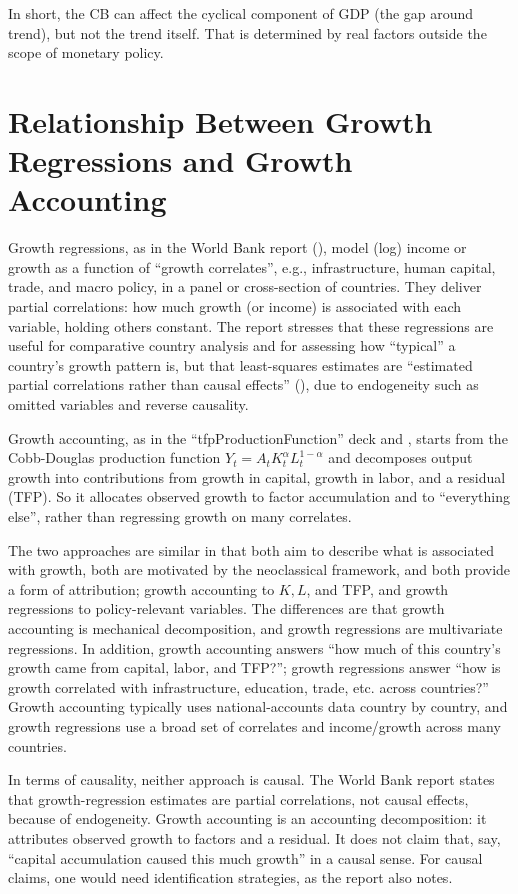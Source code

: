 \documentclass[10pt]{article}
\begin{document}
In short, the CB can affect the cyclical component of GDP (the gap around trend), but not the trend itself. That is determined by real factors outside the scope of monetary policy. 
\section{Relationship Between Growth Regressions and Growth Accounting}
Growth regressions, as in the World Bank report (\cite{wacker2024leveraging}), model (log) income or growth as a function of ``growth correlates'', e.g., infrastructure, human capital, trade, and macro policy, in a panel or cross-section of countries. They deliver partial correlations: how much growth (or income) is associated with each variable, holding others constant. The report stresses that these regressions are useful for comparative country analysis and for assessing how ``typical'' a country's growth pattern is, but that least-squares estimates are ``estimated partial correlations rather than causal effects'' (\cite[p. 3]{wacker2024leveraging}), due to endogeneity such as omitted variables and reverse causality. 

Growth accounting, as in the ``tfpProductionFunction'' deck and \cite{fernald_inklaar_ruzic_2025_productivity_slowdown}, starts from the Cobb-Douglas production function $Y_t = A_t K_t^\alpha L_t^{1-\alpha}$ and decomposes output growth into contributions from growth in capital, growth in labor, and a residual (TFP). So it allocates observed growth to factor accumulation and to ``everything else'', rather than regressing growth on many correlates. 

The two approaches are similar in that both aim to describe what is associated with growth, both are motivated by the neoclassical framework, and both provide a form of attribution; growth accounting to $K, L$, and TFP, and growth regressions to policy-relevant variables. The differences are that growth accounting is mechanical decomposition, and growth regressions are multivariate regressions. In addition, growth accounting answers ``how much of this country's growth came from capital, labor, and TFP?''; growth regressions answer ``how is growth correlated with infrastructure, education, trade, etc. across countries?'' Growth accounting typically uses national-accounts data country by country, and growth regressions use a broad set of correlates and income/growth across many countries.

In terms of causality, neither approach is causal. The World Bank report states that growth-regression estimates are partial correlations, not causal effects, because of endogeneity. Growth accounting is an accounting decomposition: it attributes observed growth to factors and a residual. It does not claim that, say, ``capital accumulation caused this much growth'' in a causal sense. For causal claims, one would need identification strategies, as the report also notes. 
\newpage 
\end{document}
